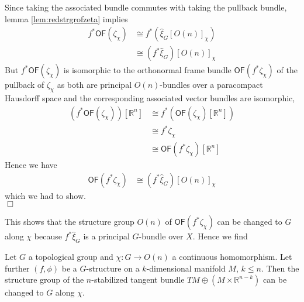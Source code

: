 \begin{prf}
Since taking the associated bundle commutes with taking the pullback bundle, lemma \ref{lem:redstrgrofzeta} implies
\begin{align*}
  f^{\ast}
  \mathsf{OF}(\zeta_{\chi})
  &\cong
  f^{\ast}
  \left(
    \hat{\xi}_{G}[O(n)]_{\chi}
  \right)
  \\
  &\cong
  \left(
    f^{\ast}\hat{\xi}_{G}
  \right)
  [O(n)]_{\chi}
\end{align*}
But $f^{\ast}\mathsf{OF}(\zeta_{\chi})$ is isomorphic to the orthonormal frame bundle $\mathsf{OF}(f^{\ast}\zeta_{\chi})$ of the pullback of $\zeta_{\chi}$ as both are principal $O(n)$-bundles over a paracompact Hausdorff space and the corresponding associated vector bundles are isomorphic,
\begin{align*}
  \left(
    f^{\ast}
    \mathsf{OF}(\zeta_{\chi})
  \right)
  [\mathbb{R}^{n}]
  &\cong
  f^{\ast}
  \left(
    \mathsf{OF}(\zeta_{\chi})[\mathbb{R}^{n}]
  \right)
  \\
  &\cong
  f^{\ast}\zeta_{\chi}
  \\
  &\cong
  \mathsf{OF}(f^{\ast}\zeta_{\chi})[\mathbb{R}^{n}]  
\end{align*}
Hence we have
\begin{align*}
  \mathsf{OF}(f^{\ast}\zeta_{\chi})
  &\cong
  \left(
    f^{\ast}\hat{\xi}_{G}
  \right)
  [O(n)]_{\chi}
\end{align*}
which we had to show.
\\
\phantom{proven}
\hfill
$\Box$
\end{prf}
This shows that the structure group $O(n)$ of $\mathsf{OF}(f^{\ast}\zeta_{\chi})$ can be changed to $G$ along $\chi$ because $f^{\ast}\hat{\xi}_{G}$ is a principal $G$-bundle over $X$. Hence we find
\\
\begin{cor}
\label{cor:redstrgrsttbundle}
Let $G$ a topological group and $\chi \colon G \to O(n)$ a continuous homomorphism. Let further $(f,\phi)$ be a $G$-structure on a $k$-dimensional manifold $M$, $k \leq n$. Then the structure group of the $n$-stabilized tangent bundle $TM \oplus (M \times \mathbb{R}^{n-k})$ can be changed to $G$ along $\chi$.
\end{cor}
